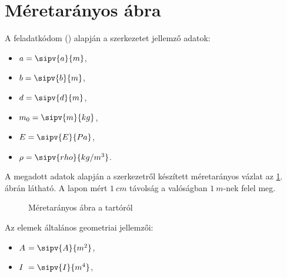 \section{Méretarányos ábra}

A feladatkódom (\texttt{})
alapján a szerkezetet jellemző adatok:
\begin{myframe}
  \vspace{-.66em}
  \begin{multicols}{2}
    \begin{itemize}
      \item $a = \sipv{a}{m}$,
      \item $b = \sipv{b}{m}$,
      \item $d = \sipv{d}{m}$,

      \item $m_0 = \sipv{m}{kg}$,
      \item $\siplaces{1}\sisci{}E = \sipv{E}{Pa}$,
      \item $\rho = \sipv{rho}{kg/m^3}$.
    \end{itemize}
  \end{multicols}
\end{myframe}

A megadott adatok alapján a szerkezetről készített méretarányos vázlat az
\ref{fig:construction}. ábrán látható. A lapon mért $\SI{1}{cm}$ távolság
a valóságban $\SI{1}{m}$-nek felel meg.

\begin{figure}[H]
  \centering
  
  \caption{Méretarányos ábra a tartóról}
  \label{fig:construction}
\end{figure}

Az elemek általános geometriai jellemzői:
\begin{itemize}
  \sisci
  \item $A\phantom{I}\hspace{-1.5mm} = \sipv{A}{m^2}$,
  \item $I\phantom{A}\hspace{-1.5mm} = \sipv{I}{m^4}$,
\end{itemize}
